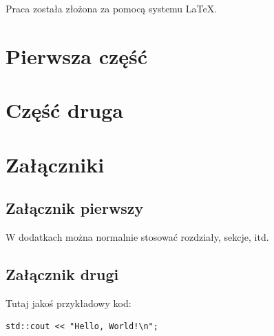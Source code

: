\documentclass[11pt,twoside,a4paper,titlepage,onecolumn]{book}
\begin{document}
\frontmatter
\tableofcontents
\listoffigures
\lstlistoflistings
\vspace*{\fill}
Praca została złożona za pomocą systemu \LaTeX.

\newpage

\mainmatter

\part{Pierwsza część}



\part{Część druga}








\part{Załączniki}

\appendix

\chapter{Załącznik pierwszy}

W dodatkach można normalnie stosować rozdziały, sekcje, itd.

\chapter{Załącznik drugi}

Tutaj jakoś przykładowy kod:

\begin{lstlisting}[caption={Przykładowy listing},captionpos=b]
	std::cout << "Hello, World!\n";
\end{lstlisting}
\end{document}
